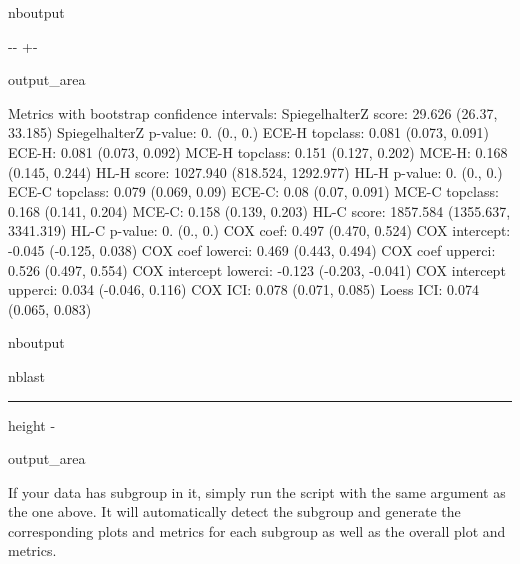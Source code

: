 \documentclass[letterpaper,10pt,english]{sphinxmanual}
\let\sphinxpxdimen\pdfpxdimen\else\newdimen\sphinxpxdimen
\begin{document}
\begin{sphinxuseclass}{nboutput}
{

\kern-\sphinxverbatimsmallskipamount\kern-\baselineskip
\kern+\FrameHeightAdjust\kern-\fboxrule
\vspace{\nbsphinxcodecellspacing}

\begin{sphinxuseclass}{output_area}
\begin{sphinxuseclass}{}


\begin{sphinxVerbatim}[commandchars=\\\{\}]
Metrics with bootstrap confidence intervals:
SpiegelhalterZ score: 29.626 (26.37, 33.185)
SpiegelhalterZ p-value: 0. (0., 0.)
ECE-H topclass: 0.081 (0.073, 0.091)
ECE-H: 0.081 (0.073, 0.092)
MCE-H topclass: 0.151 (0.127, 0.202)
MCE-H: 0.168 (0.145, 0.244)
HL-H score: 1027.940 (818.524, 1292.977)
HL-H p-value: 0. (0., 0.)
ECE-C topclass: 0.079 (0.069, 0.09)
ECE-C: 0.08 (0.07, 0.091)
MCE-C topclass: 0.168 (0.141, 0.204)
MCE-C: 0.158 (0.139, 0.203)
HL-C score: 1857.584 (1355.637, 3341.319)
HL-C p-value: 0. (0., 0.)
COX coef: 0.497 (0.470, 0.524)
COX intercept: -0.045 (-0.125, 0.038)
COX coef lowerci: 0.469 (0.443, 0.494)
COX coef upperci: 0.526 (0.497, 0.554)
COX intercept lowerci: -0.123 (-0.203, -0.041)
COX intercept upperci: 0.034 (-0.046, 0.116)
COX ICI: 0.078 (0.071, 0.085)
Loess ICI: 0.074 (0.065, 0.083)
\end{sphinxVerbatim}



\end{sphinxuseclass}
\end{sphinxuseclass}
}

\end{sphinxuseclass}
\begin{sphinxuseclass}{nboutput}
\begin{sphinxuseclass}{nblast}
\hrule height -\fboxrule\relax
\vspace{\nbsphinxcodecellspacing}

\makeatletter\setbox\nbsphinxpromptbox\box\voidb@x\makeatother

\begin{nbsphinxfancyoutput}

\begin{sphinxuseclass}{output_area}
\begin{sphinxuseclass}{}
\noindent\sphinxincludegraphics[width=702\sphinxpxdimen,height=530\sphinxpxdimen]{{notebooks_quickstart_18_1}.png}

\end{sphinxuseclass}
\end{sphinxuseclass}
\end{nbsphinxfancyoutput}

\end{sphinxuseclass}
\end{sphinxuseclass}
\sphinxAtStartPar
If your data has subgroup in it, simply run the script with the same argument as the one above. It will automatically detect the subgroup and generate the corresponding plots and metrics for each subgroup as well as the overall plot and metrics.
\end{document}
